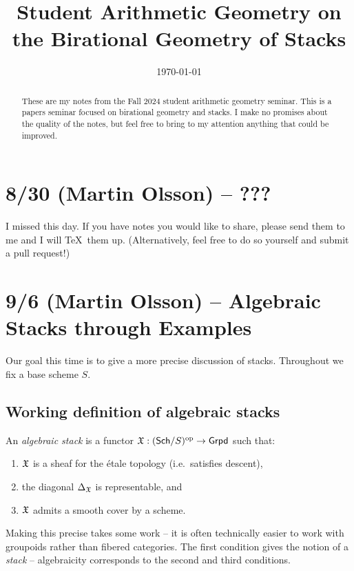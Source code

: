 \documentclass{amsart}
\title{Student Arithmetic Geometry on the Birational Geometry of Stacks}
\date{\today}
\begin{document}
\begin{abstract}
	These are my notes from the Fall 2024 student arithmetic geometry seminar.
	This is a papers seminar focused on birational geometry and stacks.
	I make no promises about the quality of the notes, but feel free to bring to my attention anything that could be improved.
\end{abstract}

\maketitle

\section{8/30 (Martin Olsson) -- ???}

I missed this day.
If you have notes you would like to share, please send them to me and I will \TeX\, them up.
(Alternatively, feel free to do so yourself and submit a pull request!)

\section{9/6 (Martin Olsson) -- Algebraic Stacks through Examples}

Our goal this time is to give a more precise discussion of stacks.
Throughout we fix a base scheme $S$.

\subsection{Working definition of algebraic stacks}


\begin{dfn}
	An \emph{algebraic stack} is a functor $\mathfrak{X}: (\mathsf{Sch} / S)^{\mathrm{op}} \to \mathsf{Grpd}$ such that:
	\begin{enumerate}
		\item $\mathfrak{X}$ is a sheaf for the \'etale topology (i.e.\ satisfies descent),
		\item the diagonal $\Delta_{\mathfrak{X}}$ is representable, and 
		\item $\mathfrak{X}$ admits a smooth cover by a scheme.
	\end{enumerate}
\end{dfn}

Making this precise takes some work -- it is often technically easier to work with groupoids rather than fibered categories.
The first condition gives the notion of a \emph{stack} -- algebraicity corresponds to the second and third conditions.
\end{document}
